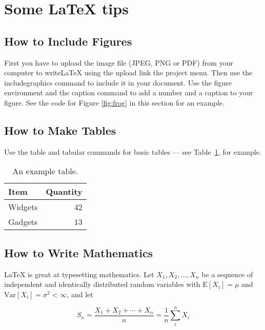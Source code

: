 \documentclass[a4paper]{article}
\begin{document}
\newpage
\section{Some LaTeX tips}
\label{sec:latex}
\subsection{How to Include Figures}

First you have to upload the image file (JPEG, PNG or PDF) from your computer to writeLaTeX using the upload link the project menu. Then use the includegraphics command to include it in your document. Use the figure environment and the caption command to add a number and a caption to your figure. See the code for Figure \ref{fig:frog} in this section for an example.


\subsection{How to Make Tables}

Use the table and tabular commands for basic tables --- see Table~\ref{tab:widgets}, for example.

\begin{table}
\centering
\begin{tabular}{l|r}
Item & Quantity \\\hline
Widgets & 42 \\
Gadgets & 13
\end{tabular}
\caption{\label{tab:widgets}An example table.}
\end{table}

\subsection{How to Write Mathematics}

\LaTeX{} is great at typesetting mathematics. Let $X_1, X_2, \ldots, X_n$ be a sequence of independent and identically distributed random variables with $\text{E}[X_i] = \mu$ and $\text{Var}[X_i] = \sigma^2 < \infty$, and let

\begin{equation}
S_n = \frac{X_1 + X_2 + \cdots + X_n}{n}
      = \frac{1}{n}\sum_{i}^{n} X_i
\label{eq:sn}
\end{equation}
\end{document}
